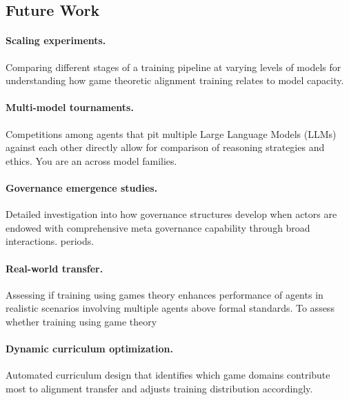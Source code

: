\subsection{Future Work}

\paragraph{Scaling experiments.}
Comparing different stages of a training pipeline at varying levels of models for understanding how game theoretic alignment training relates to model capacity.

\paragraph{Multi-model tournaments.}
Competitions among agents that pit multiple Large Language Models (LLMs) against each other directly allow for comparison of reasoning strategies and ethics. You are an
across model families.

\paragraph{Governance emergence studies.}
Detailed investigation into how governance structures develop when actors are endowed with comprehensive meta governance capability through broad interactions.
periods.

\paragraph{Real-world transfer.}
Assessing if training using games theory enhances performance of agents in realistic scenarios involving multiple agents above formal standards. To assess whether training using game theory

\paragraph{Dynamic curriculum optimization.}
Automated curriculum design that identifies which game domains
contribute most to alignment transfer and adjusts training distribution
accordingly.
